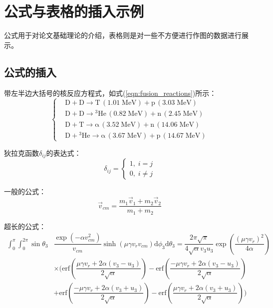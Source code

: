 \chapter{公式与表格的插入示例}
\label{cha:for_tab_example}
公式用于对论文基础理论的介绍，表格则是对一些不方便进行作图的数据进行展示。

\section{公式的插入}
\label{sec:formula}
带左半边大括号的核反应方程式，如式(\ref{eqn:fusion_reactions})所示：
\begin{equation}
	\label{eqn:fusion_reactions}
	\left\{
	\begin{aligned}
		&\mbox{D}+\mbox{D}\rightarrow \mbox{T}\,(\text{1.01}\;\mbox{MeV})+\mbox{p}\,(\text{3.03}\;\mbox{MeV}) \\
		&\mbox{D}+\mbox{D}\rightarrow {^{\text{3}}}\mbox{He}\,(\text{0.82}\;\mbox{MeV})+\mbox{n}\,(\text{2.45}\;\mbox{MeV}) \\
		&\mbox{D}+\mbox{T}\rightarrow \text{α}\,(\text{3.52}\;\mbox{MeV})+\mbox{n}\,(\text{14.06}\;\mbox{MeV}) \\
		&\mbox{D}+{^{\text{3}}}\mbox{He}\rightarrow \text{α}\,(\text{3.67}\;\mbox{MeV})+\mbox{p}\,(\text{14.67}\;\mbox{MeV})
	\end{aligned}
	\right.
\end{equation}

狄拉克函数$\delta_{ij}$的表达式：
\begin{equation}
	\label{eqn:delta_ij}
	\delta_{ij}=\left\{
	\begin{aligned}
		1,\; i=j \\
		0,\; i\neq j
	\end{aligned}
	\right.
\end{equation}

一般的公式：
\begin{equation}
	\label{eqn:vec_v_cm}
	\vec{v}_{cm}=\dfrac{m_{1}\vec{v}_{1}+m_{2}\vec{v}_{2}}{m_{1}+m_{2}}
\end{equation}

超长的公式\cite{appelbe2011production}：
\begin{equation}
	\label{eqn:iint_theta3_phi3}
	\begin{split}
		\int_{0}^{\pi}\int_{0}^{2\pi} \sin\theta_{3}&\dfrac{\exp(-\alpha v_{cm}^{2})}{v_{cm}}\sinh(\mu \gamma v_{r}v_{cm})\mbox{d}\phi_{3}\mbox{d}\theta_{3}=\dfrac{2\pi \sqrt{\pi}}{4\sqrt{\alpha}v_{3}u_{3}}\exp\left( \dfrac{(\mu \gamma v_{r})^{2}}{4\alpha} \right) \\
		&\times \Bigg( \mbox{erf}\left( \dfrac{\mu \gamma v_{r}+2\alpha(v_{3}-u_{3})}{2\sqrt{\alpha}} \right)-\mbox{erf}\left( \dfrac{-\mu \gamma v_{r}+2\alpha(v_{3}-u_{3})}{2\sqrt{\alpha}} \right) \\
		&+\mbox{erf}\left( \dfrac{-\mu \gamma v_{r}+2\alpha(v_{3}+u_{3})}{2\sqrt{\alpha}} \right)-\mbox{erf}\left( \dfrac{\mu \gamma v_{r}+2\alpha(v_{3}+u_{3})}{2\sqrt{\alpha}} \right) \Bigg)
	\end{split}
\end{equation}

